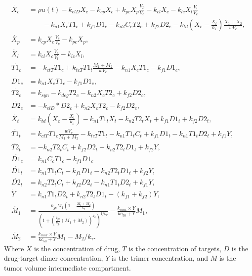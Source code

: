 \begin{subequations} \label{eq:full}
	\begin{align}
		\dot{X_c} &  = \rho u(t) - k_{elD} X_c - k_{cp} X_c + k_{pc} X_p \frac{V_p}{V_c} - k_{cl} X_c  - k_{lc} X_l \frac{V_l}{V_c} \nonumber \\ &\qquad - k_{n1} X_c T1_c + k_{f1} D1_c  - k_{n2} C_c T2_c + k_{f2} D2_c - k_{td} (X_c-\frac{X_t}{k_\varepsilon}) \frac{X_1+X_2}{w V_c} ,\\
		\dot{X_p} &  = k_{cp} X_c \frac{V_c}{V_p} - k_{pc} X_p,\\
		\dot{X_l} &  = k_{cl} X_c \frac{V_c}{V_l} - k_{lc} X_l,\\
		\dot{T1_c} &= - k_{ctT} T1_c + k_{tcT} T1_t \frac{M_1 +M_2}{w V_c} -k_{n1} X_c T1_c -k_{f1} D1_c, \\
		\dot{D1_c} &= k_{n1} X_c T1_c -k_{f1} D1_c, \\
		\dot{T2_c} &= k_{syn} - k_{deg} T2_c - k_{n2} X_c T2_c + k_{f2} D2_c, \\
		\dot{D2_c} &= -k_{elD}*D2_c +k_{n2} X_c T2_c -k_{f2} D2_c,\\
		\dot{X_t} &  = k_{td} (X_c-\frac{X_t}{k_\varepsilon}) - k_{n1} T1_t X_t - k_{n2} T2_t X_t + k_{f1} D1_t + k_{f2} D2_t,\\
		\dot{T1_t} & = k_{ctT} T1_c \frac{w V_c}{M_1+M_2} - k_{tcT} T1_t - k_{n1} T1_t C_t + k_{f1} D1_t - k_{n1} T1_t D2_t + k_{f1} Y,\\
		\dot{T2_t} & = - k_{n2} T2_t C_t + k_{f2} D2_t - k_{n2} T2_t D1_t + k_{f2} Y,\\
		\dot{D1_c} & = k_{n1} C_c T1_c - k_{f1} D1_c\\
		\dot{D1_t} & = k_{n1} T1_t C_t - k_{f1} D1_t - k_{n2} T2_t D1_t + k_{f2} Y ,\\
		\dot{D2_t} & = k_{n2} T2_t C_t + k_{f2} D2_t - k_{n1} T1_t D2_t + k_{f1} Y,\\
		\dot{Y} & = k_{n1} T1_t D2_t + k_{n2} T2_t D1_t - (k_{f1}+k_{f2}) Y, \\
		\dot{M_1} & = \frac{k_{ge} M_1 (1-\frac{M_1+M_2}{k_{v}})}{(1+(\frac{k_{ge}}{k_{gl}} (M_1+M_2))^{k_\psi})^{1/k_\psi}} -\frac{k_{max}\times Y}{kc_{50}+Y} M_1, \\
		\dot{M_2} & = \frac{k_{max}\times Y}{kc_{50}+Y} M_1 - M_2/k_\tau.
	\end{align}
\end{subequations}
% 
Where $X$ is the concentration of drug, $T$ is the concentration of targets, $D$ is the drug-target dimer concentration, $Y$ is the trimer concentration, and $M$ is the tumor volume intermediate compartment. 

